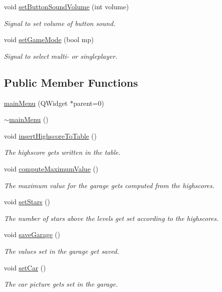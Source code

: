 \begin{DoxyCompactItemize}
void \mbox{\hyperlink{classmain_menu_a21a2d9d232738a64061628b988c15a30}{set\+Button\+Sound\+Volume}} (int volume)
\begin{DoxyCompactList}\small\item\em Signal to set volume of button sound. \end{DoxyCompactList}\item 
void \mbox{\hyperlink{classmain_menu_a0eb01011a1b95cacfb26975574993c65}{set\+Game\+Mode}} (bool mp)
\begin{DoxyCompactList}\small\item\em Signal to select multi-\/ or singleplayer. \end{DoxyCompactList}\end{DoxyCompactItemize}
\subsection*{Public Member Functions}
\begin{DoxyCompactItemize}
\item 
\mbox{\hyperlink{classmain_menu_ad8f61b029e83676e74478cd43ec92119}{main\+Menu}} (Q\+Widget $\ast$parent=0)
\item 
\mbox{\hyperlink{classmain_menu_a678e20e05ce6566c1810ef47497d2d50}{$\sim$main\+Menu}} ()
\item 
void \mbox{\hyperlink{classmain_menu_a3bf39f2aa22306f4d50d1721ba49d4c7}{insert\+Highscore\+To\+Table}} ()
\begin{DoxyCompactList}\small\item\em The highscore gets written in the table. \end{DoxyCompactList}\item 
void \mbox{\hyperlink{classmain_menu_a7dc76e897fdc12c213b341d434de3e24}{compute\+Maximum\+Value}} ()
\begin{DoxyCompactList}\small\item\em The maximum value for the garage gets computed from the highscores. \end{DoxyCompactList}\item 
void \mbox{\hyperlink{classmain_menu_adca150b2487152f0145a0c9afc255915}{set\+Stars}} ()
\begin{DoxyCompactList}\small\item\em The number of stars above the levels get set according to the highscores. \end{DoxyCompactList}\item 
void \mbox{\hyperlink{classmain_menu_a3be635fe4ff021549ee65464ffc7a21e}{save\+Garage}} ()
\begin{DoxyCompactList}\small\item\em The values set in the garage get saved. \end{DoxyCompactList}\item 
void \mbox{\hyperlink{classmain_menu_a413157b043b173cb7b5a81f0deab931c}{set\+Car}} ()
\begin{DoxyCompactList}\small\item\em The car picture gets set in the garage. \end{DoxyCompactList}\end{DoxyCompactItemize}
